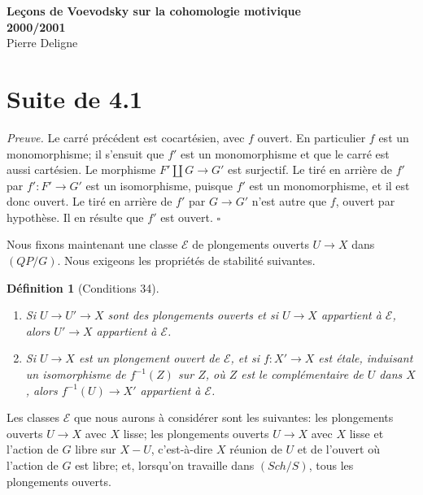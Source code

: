 \documentclass[11pt]{article}
\theoremstyle{deligne}
\newtheorem*{definition*}{Définition}
\newenvironment{proofdel}{\noindent\textit{Preuve.}}{\hfill$\square$}
\begin{document}
\begin{center}
{\Large\bfseries Leçons de Voevodsky sur la cohomologie motivique\\
2000/2001}\\[0.5em]
{\large Pierre Deligne}
\end{center}

\section*{Suite de 4.1}

\begin{proofdel}
Le carré précédent est cocartésien, avec \(f\) ouvert. En particulier \(f\) est un monomorphisme; il s'ensuit que \(f'\) est un monomorphisme et que le carré est aussi cartésien. Le morphisme \(F'\amalg G\to G'\) est surjectif. Le tiré en arrière de \(f'\) par \(f':F'\to G'\) est un isomorphisme, puisque \(f'\) est un monomorphisme, et il est donc ouvert. Le tiré en arrière de \(f'\) par \(G\to G'\) n'est autre que \(f\), ouvert par hypothèse. Il en résulte que \(f'\) est ouvert.
\end{proofdel}

Nous fixons maintenant une classe \(\mathcal E\) de plongements ouverts \(U\to X\) dans \((QP/G)\). Nous exigeons les propriétés de stabilité suivantes.

\begin{definition*}[Conditions 34]
\begin{enumerate}[label=\arabic*.]
\item Si \(U\to U'\to X\) sont des plongements ouverts et si \(U\to X\) appartient à \(\mathcal E\), alors \(U'\to X\) appartient à \(\mathcal E\).
\item Si \(U\to X\) est un plongement ouvert de \(\mathcal E\), et si \(f:X'\to X\) est étale, induisant un isomorphisme de \(f^{-1}(Z)\) sur \(Z\), où \(Z\) est le complémentaire de \(U\) dans \(X\), alors \(f^{-1}(U)\to X'\) appartient à \(\mathcal E\).
\end{enumerate}
\end{definition*}

Les classes \(\mathcal E\) que nous aurons à considérer sont les suivantes: les plongements ouverts \(U\to X\) avec \(X\) lisse; les plongements ouverts \(U\to X\) avec \(X\) lisse et l'action de \(G\) libre sur \(X-U\), c'est-à-dire \(X\) réunion de \(U\) et de l'ouvert où l'action de \(G\) est libre; et, lorsqu'on travaille dans \((Sch/S)\), tous les plongements ouverts.
\end{document}
